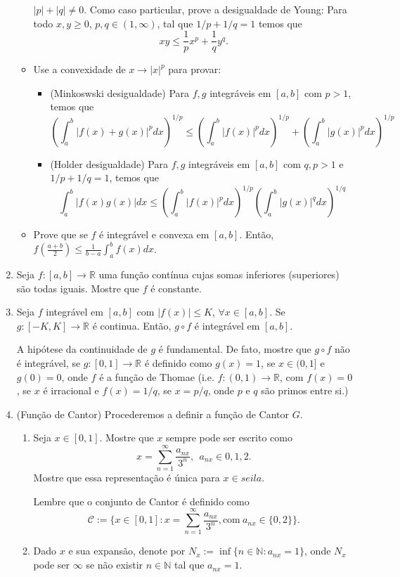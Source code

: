\documentclass{article}
\theoremstyle{plain}
\theoremstyle{definition}
\theoremstyle{remark}
\newcommand{\R}{{\mathbb R}}
\begin{document}
\begin{enumerate}
\begin{itemize}
     $|p|+|q|\neq0$.
    Como caso particular, prove a desigualdade de Young: Para todo $x,y \geq 0$, $p,q\in(1,\infty)$, tal que $1/p+1/q=1$ temos que 
    $$ xy \leq \frac{1}{p} x^{p}+\frac{1}{q}y^{q}. $$
    \item Use a convexidade de $x\rightarrow |x|^{p}$  para provar:
      \begin{itemize}
      \item (Minkoswski desigualdade) Para $f, g$
      integráveis em $[a,b]$ com $p>1$, temos que 
      $$
      \left(\int_{a}^{b} |f(x)+g(x)|^{p}dx\right)^{1/p} \leq \left(\int_{a}^{b} |f(x)|^{p}dx\right)^{1/p}
      +\left(\int_{a}^{b} |g(x)|^{p}dx\right)^{1/p}$$
      \item (Holder desigualdade)
      Para $f, g$
      integráveis em $[a,b]$ com $q, p>1$
      e $1/p+1/q=1$, temos que 
      $$
      \int_{a}^{b} |f(x)g(x)|dx  \leq \left(\int_{a}^{b} |f(x)|^{p}dx\right)^{1/p}
\left(\int_{a}^{b} |g(x)|^{q}dx\right)^{1/q}$$
      \end{itemize}
    \item Prove que se $f$ é integrável e convexa em $[a,b]$.
    Então, $f(\frac{a+b}{2}) \leq \frac{1}{b-a}\int_{a}^b  f(x)dx$.
   \end{itemize} 
  \item Seja $f:[a,b] \rightarrow \mathbb{R}$ uma função contínua cujas somas inferiores (superiores) são todas iguais. Mostre que $f$ é constante.
  \item Seja $f$ integrável em $[a,b]$ com 
  $|f(x)|\leq K$, $\forall x \in [a,b]$. Se 
  $g:[-K,K]\rightarrow \R$ é continua. Então, 
  $g \circ f$ é integrável em $[a,b]$.
  
  A hipótese da continuidade de $g$ é fundamental. 
  De fato, mostre que $g \circ f$ não é integrável, se $g:[0,1]\rightarrow \R$ é definido como  
  $g(x)=1$, se $x \in (0,1]$ e $g(0)=0$, onde 
  $f$ é a função de Thomae (i.e. 
  $f:(0,1)\rightarrow \R$, com $f(x)=0$, se $x$ é irracional e $f(x)=1/q$, se 
  $x=p/q$, onde $p$ e $q$ são primos entre si.)
  \item (Função de Cantor) 
  Procederemos a definir a função de Cantor $G$.
  \begin{enumerate}
   \item Seja 
   $x \in [0,1]$. 
   Mostre que $x$ sempre pode ser escrito como 
   $$ x= \sum_{n=1}^{\infty} \frac{a_{nx}}{3^{n}}, \ \ a_{nx} \in {0,1,2}.$$
   Mostre que essa representação é única para $x \in seila$.
   
   Lembre que o conjunto de Cantor é definido como 
   $$\mathcal{C}:=\{ x \in [0,1]: x=\sum_{n=1}^{\infty} \frac{a_{nx}}{3^{n}}, \text{com} \ a_{nx} \in \{0,2\}\}.$$ 
   \item Dado $x$ e sua expansão, denote por 
   $N_{x}:=\inf \{n \in \mathbb{N}: a_{nx}=1\}$, onde $N_{x}$ 
   pode ser $\infty$ 
   se não existir $n \in \mathbb{N}$ tal que $a_{nx}=1$.


\end{enumerate}
\end{enumerate}
\end{document}

